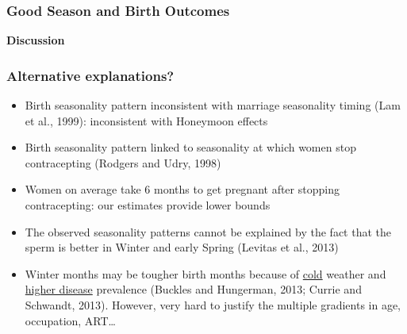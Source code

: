\documentclass[10pt,letterpaper,subeqn]{beamer}
\begin{document}

\begin{frame}
\frametitle{Good Season and Birth Outcomes}

\end{frame}


\begin{frame}
  \begin{center}
    \textbf{Discussion}
  \end{center}
\end{frame}

\begin{frame}
\frametitle{Alternative explanations?}
\begin{itemize}
\item Birth seasonality pattern inconsistent with marriage seasonality timing (Lam et al., 1999): inconsistent with Honeymoon effects
\item Birth seasonality pattern linked to seasonality at which women stop contracepting (Rodgers and Udry,  1998)
\item Women on average take 6 months to get pregnant after stopping contracepting: our estimates provide lower bounds
\item The observed seasonality patterns cannot be explained by the fact that the sperm is better in Winter and early Spring (Levitas et al., 2013)
\item Winter months may be tougher birth months because of \underline{cold} weather and \underline{higher disease} prevalence (Buckles and Hungerman, 2013; Currie and Schwandt, 2013).  However, very hard to justify the multiple gradients in age, occupation, ART\ldots
\end{itemize}
\end{frame}
\end{document}

